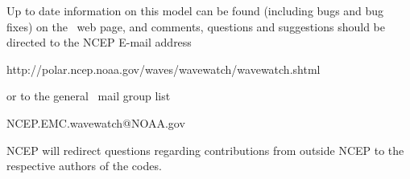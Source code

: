 \vspace{\baselineskip} \noindent 
Up to date information on this model can be found (including bugs and bug
fixes) on the \ws\ web page, and comments, questions and suggestions should be
directed to the NCEP E-mail address

\begin{center}
http://polar.ncep.noaa.gov/waves/wavewatch/wavewatch.shtml
\end{center}

\noindent
or to the general \ws\ mail group list

\begin{center}
NCEP.EMC.wavewatch@NOAA.gov
\end{center}

\noindent
NCEP will redirect questions regarding contributions from outside NCEP to the
respective authors of the codes.
